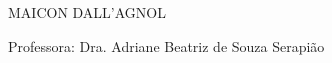   \begin{capa}
	\begin{center}
	\Large\imprimirinstituicao
	\end{center}

	\begin{center}
	\vspace*{3.4cm}
	\Large MAICON DALL'AGNOL
	\vspace*{1.5cm}
	
	\Large \textbf{\imprimirtitulo}
	
	\vspace*{3.4cm}
	
	\noindent Professora: Dra. Adriane Beatriz de Souza Serapião
	
	\vspace*{3.4cm}
	
	{\large\imprimirlocal}
	\par
	{\large\imprimirdata}
	\vspace*{1cm}
	\end{center}
  \end{capa}